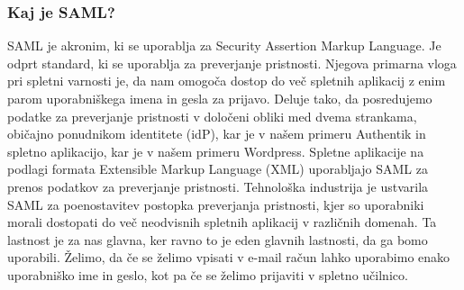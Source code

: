 \documentclass[a4paper,12pt,openright]{book}
\begin{document}
\subsubsection{Kaj je SAML?}
SAML je akronim, ki se uporablja za Security Assertion Markup Language. Je odprt standard, ki se uporablja za preverjanje pristnosti. Njegova primarna vloga pri spletni varnosti je, da nam omogoča dostop do več spletnih aplikacij z enim parom uporabniškega imena in gesla za prijavo. Deluje tako, da posredujemo podatke za preverjanje pristnosti v določeni obliki med dvema strankama, običajno ponudnikom identitete (idP), kar je v našem primeru Authentik in spletno aplikacijo, kar je v našem primeru Wordpress.
Spletne aplikacije na podlagi formata Extensible Markup Language (XML) uporabljajo SAML za prenos podatkov za preverjanje pristnosti.
\newline
Tehnološka industrija je ustvarila SAML za poenostavitev postopka preverjanja pristnosti, kjer so uporabniki morali dostopati do več neodvisnih spletnih aplikacij v različnih domenah. Ta lastnost je za nas glavna, ker ravno to je eden glavnih lastnosti, da ga bomo uporabili. Želimo, da če se želimo vpisati v e-mail račun lahko uporabimo enako uporabniško ime in geslo, kot pa če se želimo prijaviti v spletno učilnico. 
\end{document}
